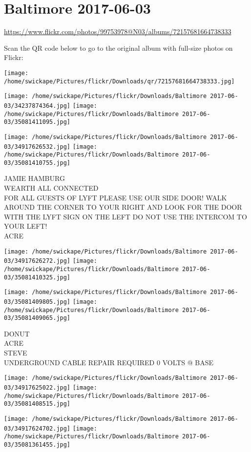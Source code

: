 \documentclass[10pt,letterpaper]{article}
\begin{document}
\section*{Baltimore 2017-06-03}

\url{https://www.flickr.com/photos/99753978@N03/albums/72157681664738333}

Scan the QR code below to go to the original album with full-size photos on Flickr:

\texttt{[image: /home/swickape/Pictures/flickr/Downloads/qr/72157681664738333.jpg]}
\pagebreak

\texttt{[image: /home/swickape/Pictures/flickr/Downloads/Baltimore 2017-06-03/34237874364.jpg]}
\texttt{[image: /home/swickape/Pictures/flickr/Downloads/Baltimore 2017-06-03/35081411095.jpg]}

\texttt{[image: /home/swickape/Pictures/flickr/Downloads/Baltimore 2017-06-03/34917626532.jpg]}
\texttt{[image: /home/swickape/Pictures/flickr/Downloads/Baltimore 2017-06-03/35081410755.jpg]}

JAMIE HAMBURG\\
WEARTH ALL CONNECTED\\
FOR ALL GUESTS OF LYFT PLEASE USE OUR SIDE DOOR!  WALK AROUND THE CORNER TO YOUR RIGHT AND LOOK FOR THE DOOR WITH THE LYFT SIGN ON THE LEFT DO NOT USE THE INTERCOM TO YOUR LEFT!\\
ACRE
\pagebreak

\texttt{[image: /home/swickape/Pictures/flickr/Downloads/Baltimore 2017-06-03/34917626272.jpg]}
\texttt{[image: /home/swickape/Pictures/flickr/Downloads/Baltimore 2017-06-03/35081410325.jpg]}

\texttt{[image: /home/swickape/Pictures/flickr/Downloads/Baltimore 2017-06-03/35081409805.jpg]}
\texttt{[image: /home/swickape/Pictures/flickr/Downloads/Baltimore 2017-06-03/35081409065.jpg]}

DONUT\\
ACRE\\
STEVE\\
UNDERGROUND CABLE REPAIR REQUIRED 0 VOLTS @ BASE
\pagebreak

\texttt{[image: /home/swickape/Pictures/flickr/Downloads/Baltimore 2017-06-03/34917625022.jpg]}
\texttt{[image: /home/swickape/Pictures/flickr/Downloads/Baltimore 2017-06-03/35081408515.jpg]}

\texttt{[image: /home/swickape/Pictures/flickr/Downloads/Baltimore 2017-06-03/34917624702.jpg]}
\texttt{[image: /home/swickape/Pictures/flickr/Downloads/Baltimore 2017-06-03/35081361455.jpg]}
\end{document}

